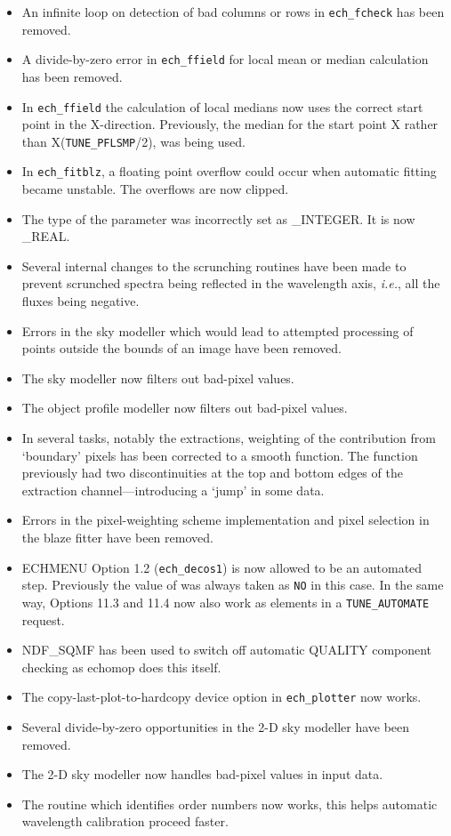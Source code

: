 \begin{itemize}
\item An infinite loop on detection of bad columns or rows in {\tt ech\_fcheck}
   has been removed.
\item A divide-by-zero error in {\tt ech\_ffield} for local mean or median
   calculation has been removed.
\item In {\tt ech\_ffield} the calculation of local medians now uses the correct
   start point in the X-direction.  Previously, the median for the start
   point X rather than
   X\sunspec{$-$}{-}({\tt{TUNE\_PFLSMP}}/2), was being used.
\item In {\tt ech\_fitblz}, a floating point overflow could occur when automatic
   fitting became unstable.  The overflows are now clipped.
\item The type of the parameter
    was incorrectly set as
   \_INTEGER.  It is now \_REAL.
\item Several internal changes to the scrunching routines have been made to
   prevent scrunched spectra being reflected in the wavelength axis,
   {\it{i.e.}}, all the fluxes being negative.
\item Errors in the sky modeller which would lead to attempted processing
   of points outside the bounds of an image have been removed.
\item The sky modeller now filters out bad-pixel values.
\item The object profile modeller now filters out bad-pixel values.
\item In several tasks, notably the extractions, weighting of the
   contribution from `boundary' pixels has been corrected to a smooth
   function.  The function previously had two discontinuities at the top
   and bottom edges of the extraction channel---introducing a `jump' in
   some data.
\item Errors in the pixel-weighting scheme implementation and pixel
   selection in the blaze fitter have been removed.
\item ECHMENU Option 1.2 ({\tt{ech\_decos1}}) is now allowed to be an automated
   step. Previously the value of 
   was always taken as \verb+NO+ in
   this case.  In the same way, Options 11.3 and 11.4 now also work as
   elements in a {\tt TUNE\_AUTOMATE} request.
\item NDF\_SQMF has been used to switch off automatic QUALITY component
   checking as {\sc echomop} does this itself.
\item The copy-last-plot-to-hardcopy device option in {\tt ech\_plotter}
   now works.
\item Several divide-by-zero opportunities in the 2-D sky modeller have been
   removed.
\item The 2-D sky modeller now handles bad-pixel values in input data.
\item The routine which identifies order numbers now works, this helps
   automatic wavelength calibration proceed faster.
\end{itemize}


